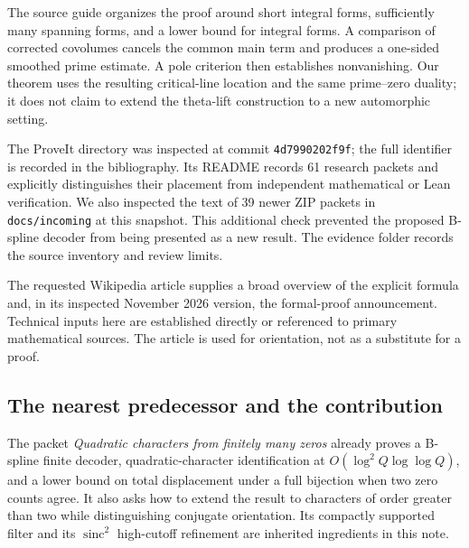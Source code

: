 \documentclass[11pt,letterpaper]{article}
\theoremstyle{definition}\newtheorem{definition}[theorem]{Definition}
\theoremstyle{remark}\newtheorem{remark}[theorem]{Remark}
\newcommand{\sinc}{\operatorname{sinc}}
\begin{document}
The source guide organizes the proof around short integral forms,
sufficiently many spanning forms, and a lower bound for integral forms.
A comparison of corrected covolumes cancels the common main term and
produces a one-sided smoothed prime estimate. A pole criterion then
establishes nonvanishing. Our theorem uses the resulting critical-line
location and the same prime--zero duality; it does not claim to extend
the theta-lift construction to a new automorphic setting.

The ProveIt directory \cite{proveit} was inspected at commit
\texttt{4d7990202f9f}; the full identifier is recorded in the bibliography.
Its README records 61 research packets and explicitly distinguishes
their placement from independent mathematical or Lean verification.
We also inspected the text of 39 newer ZIP packets in
\texttt{docs/incoming} at this snapshot. This additional check prevented
the proposed B-spline decoder from being presented as a new result.
The evidence folder records the source inventory and review limits.

The requested Wikipedia article \cite{wiki} supplies a broad overview
of the explicit formula and, in its inspected November 2026 version,
the formal-proof announcement. Technical inputs here are established
directly or referenced to primary mathematical sources. The article is
used for orientation, not as a substitute for a proof.

\subsection{The nearest predecessor and the contribution}

The packet \emph{Quadratic characters from finitely many zeros}
\cite{quadraticpacket} already proves a B-spline finite decoder,
quadratic-character identification at
$O(\log^2 Q\log\log Q)$, and a lower bound on total displacement under
a full bijection when two zero counts agree. It also asks how to extend
the result to characters of order greater than two while distinguishing
conjugate orientation. Its compactly supported filter and its
$\sinc^2$ high-cutoff refinement are inherited ingredients in this note.
\end{document}
